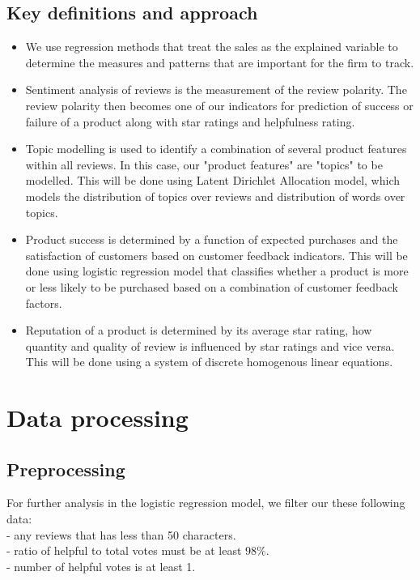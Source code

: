 \documentclass[reqno]{article}
\theoremstyle{definition}
\theoremstyle{definition}
\theoremstyle{remark}
\begin{document}
\subsection{Key definitions and approach}
\begin{itemize}
    \item We use regression methods that treat the sales as the explained variable to determine the measures and patterns that are important for the firm to track. 
    \item Sentiment analysis of reviews is the measurement of the review polarity. The review polarity then becomes one of our indicators for prediction of success or failure of a product along with star ratings and helpfulness rating.
    \item Topic modelling is used to identify a combination of several product features within all reviews. In this case, our "product features" are "topics" to be modelled. This will be done using Latent Dirichlet Allocation model, which models the distribution of topics over reviews and distribution of words over topics.
    \item Product success is determined by a function of expected purchases and the satisfaction of customers based on customer feedback indicators. This will be done using logistic regression model that classifies whether a product is more or less likely to be purchased based on a combination of customer feedback factors.
    \item Reputation of a product is determined by its average star rating, how quantity and quality of review is influenced by star ratings and vice versa. This will be done using a system of discrete homogenous linear equations.
\end{itemize}
\section{Data processing}
\subsection{Preprocessing}
For further analysis in the logistic regression model, we filter our these following data: \\
- any reviews that has less than 50 characters.\\
- ratio of helpful to total votes must be at least $98\%$.\\
- number of helpful votes is at least 1.
\end{document}
